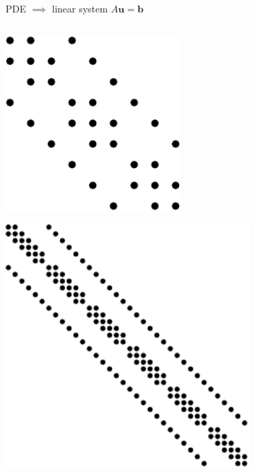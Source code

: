 \documentclass[10pt,
               svgnames,
               hyperref={colorlinks,citecolor=DeepPink4,linkcolor=FireBrick,urlcolor=Maroon},
               usepdftitle=false]{beamer}
\newcommand{\bb}{\mathbf{b}}
\newcommand{\bu}{\mathbf{u}}
\begin{document}
\begin{frame}{PDE $\implies$ linear system $A\bu=\bb$}
\begin{columns}
\begin{column}{0.27\textwidth}
\bigskip\medskip
\hfill \includegraphics[width=0.5\textwidth]{images/lapspy5.pdf}

\bigskip
\hfill \includegraphics[width=0.7\textwidth]{images/lapspy8.pdf}

\end{column}
\end{columns}
\end{frame}
\end{document}
